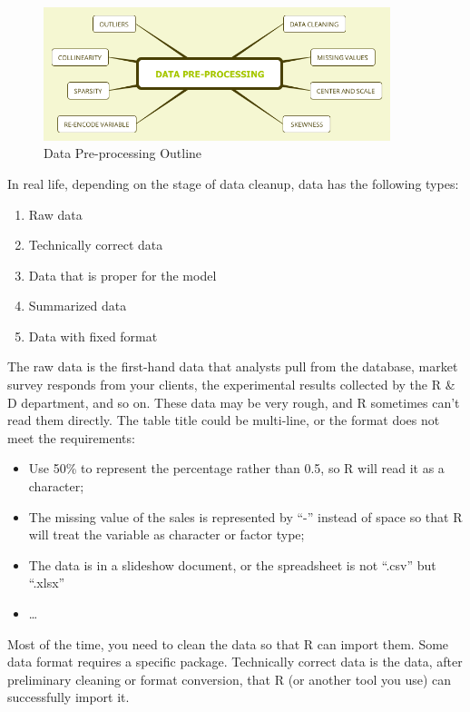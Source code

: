 \documentclass[12pt,]{krantz}
\providecommand{\tightlist}{%
  \setlength{\itemsep}{0pt}\setlength{\parskip}{0pt}}
\begin{document}
\begin{figure}
\centering
\includegraphics[width=0.9\textwidth,height=\textheight]{images/DataPre-processing.png}
\caption{Data Pre-processing Outline}
\end{figure}

In real life, depending on the stage of data cleanup, data has the following types:

\begin{enumerate}
\def\labelenumi{\arabic{enumi}.}
\tightlist
\item
  Raw data
\item
  Technically correct data
\item
  Data that is proper for the model
\item
  Summarized data
\item
  Data with fixed format
\end{enumerate}

The raw data is the first-hand data that analysts pull from the database, market survey responds from your clients, the experimental results collected by the R \& D department, and so on. These data may be very rough, and R sometimes can't read them directly. The table title could be multi-line, or the format does not meet the requirements:

\begin{itemize}
\tightlist
\item
  Use 50\% to represent the percentage rather than 0.5, so R will read it as a character;
\item
  The missing value of the sales is represented by ``-'' instead of space so that R will treat the variable as character or factor type;
\item
  The data is in a slideshow document, or the spreadsheet is not ``.csv'' but ``.xlsx''
\item
  \ldots{}
\end{itemize}

Most of the time, you need to clean the data so that R can import them. Some data format requires a specific package. Technically correct data is the data, after preliminary cleaning or format conversion, that R (or another tool you use) can successfully import it.
\end{document}
